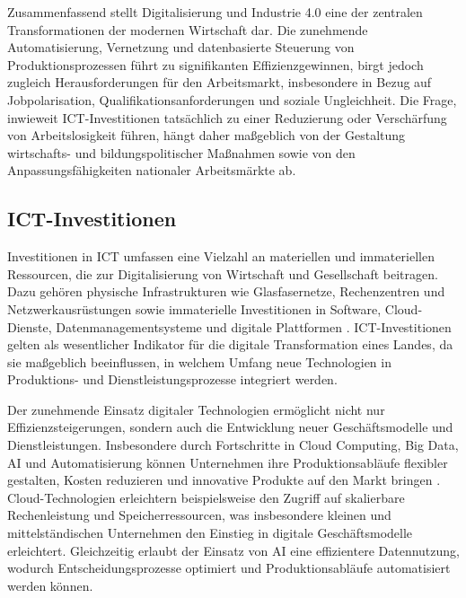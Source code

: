 Zusammenfassend stellt Digitalisierung und Industrie 4.0 eine der zentralen 
Transformationen der modernen Wirtschaft dar. Die zunehmende Automatisierung, Vernetzung 
und datenbasierte Steuerung von Produktionsprozessen führt zu signifikanten 
Effizienzgewinnen, birgt jedoch zugleich Herausforderungen für den Arbeitsmarkt, 
insbesondere in Bezug auf Jobpolarisation, Qualifikationsanforderungen und soziale 
Ungleichheit. Die Frage, inwieweit \ac{ICT}-Investitionen tatsächlich zu einer Reduzierung 
oder Verschärfung von Arbeitslosigkeit führen, hängt daher maßgeblich von der Gestaltung 
wirtschafts- und bildungspolitischer Maßnahmen sowie von den Anpassungsfähigkeiten 
nationaler Arbeitsmärkte ab.


\subsection{ICT-Investitionen}

Investitionen in \ac{ICT} umfassen eine Vielzahl an materiellen und immateriellen 
Ressourcen, die zur Digitalisierung von Wirtschaft und Gesellschaft beitragen. Dazu gehören 
physische Infrastrukturen wie Glasfasernetze, Rechenzentren und Netzwerkausrüstungen sowie 
immaterielle Investitionen in Software, Cloud-Dienste, Datenmanagementsysteme und digitale 
Plattformen \parencite[S. 15ff]{oecd2019measuring}. \ac{ICT}-Investitionen gelten als 
wesentlicher Indikator für die digitale Transformation eines Landes, da sie maßgeblich 
beeinflussen, in welchem Umfang neue Technologien in Produktions- und 
Dienstleistungsprozesse integriert werden.

Der zunehmende Einsatz digitaler Technologien ermöglicht nicht nur Effizienzsteigerungen, 
sondern auch die Entwicklung neuer Geschäftsmodelle und Dienstleistungen. Insbesondere 
durch Fortschritte in Cloud Computing, Big Data, \ac{AI} und Automatisierung können 
Unternehmen ihre Produktionsabläufe flexibler gestalten, Kosten reduzieren und innovative 
Produkte auf den Markt bringen \parencite[S. 15ff]{oecd2019measuring}. Cloud-Technologien 
erleichtern beispielsweise den Zugriff auf skalierbare Rechenleistung und 
Speicherressourcen, was insbesondere kleinen und mittelständischen Unternehmen den 
Einstieg in digitale Geschäftsmodelle erleichtert. Gleichzeitig erlaubt der Einsatz von 
\ac{AI} eine effizientere Datennutzung, wodurch Entscheidungsprozesse optimiert und 
Produktionsabläufe automatisiert werden können.

